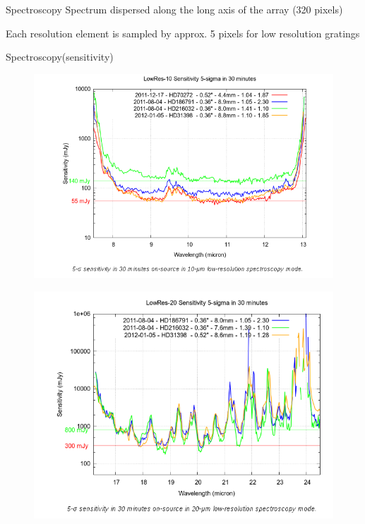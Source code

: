 \documentclass{beamer}
\begin{document}
\begin{frame}{Spectroscopy}
Spectrum dispersed along the long axis of the array (320 pixels)

Each resolution element is sampled by approx. 5 pixels for low resolution gratings
\end{frame}

\begin{frame}{Spectroscopy(sensitivity)}
\begin{figure}[H]
 \centering
 \includegraphics[scale=0.2]{img10.png}
\end{figure}
\begin{figure}[H]
 \centering
 \includegraphics[scale=0.2]{img11.png}
\end{figure}

\end{frame}
\end{document}
